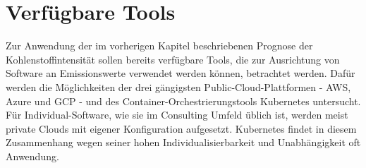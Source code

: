 
%

\section{Verfügbare Tools}\label{CAP:tools}
Zur Anwendung der im vorherigen Kapitel beschriebenen Prognose der Kohlenstoffintensität sollen bereits verfügbare Tools, die zur Ausrichtung von Software an Emissionswerte verwendet werden können, betrachtet werden.
Dafür werden die Möglichkeiten der drei gängigsten Public-Cloud-Plattformen - \ac{AWS}, Azure und \ac{GCP} - und des Container-Orchestrierungstools Kubernetes untersucht.
Für Individual-Software, wie sie im Consulting Umfeld üblich ist, werden meist private Clouds mit eigener Konfiguration aufgesetzt.
Kubernetes findet in diesem Zusammenhang wegen seiner hohen Individualisierbarkeit und Unabhängigkeit oft Anwendung.
% 

